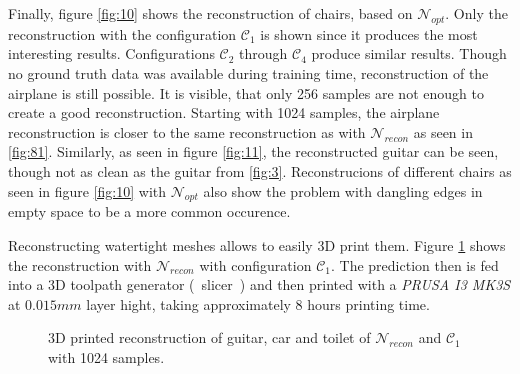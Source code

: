   Finally, figure \ref{fig:10} shows the reconstruction of chairs, based on $\mathcal{N}_{opt}$. Only the reconstruction with the configuration $\mathcal{C}_1$ is shown
  since it produces the most interesting results. Configurations $\mathcal{C}_2$ through $\mathcal{C}_4$ produce similar results. Though no ground truth data was available during training time, reconstruction
  of the airplane is still possible. It is visible, that only 256 samples are not enough to create a good reconstruction. Starting with 1024 samples, the airplane reconstruction
  is closer to the same reconstruction as with $\mathcal{N}_{recon}$ as seen in \ref{fig:81}. Similarly, as seen in figure \ref{fig:11}, the reconstructed guitar can be 
  seen, though not as clean as the guitar from \ref{fig:3}. Reconstrucions of different chairs as seen in figure \ref{fig:10} with $\mathcal{N}_{opt}$ also show the problem with dangling edges in empty space
  to be a more common occurence. 


  Reconstructing watertight meshes allows to easily 3D print them. Figure \ref{fig:13} shows the reconstruction with $\mathcal{N}_{recon}$ with configuration $\mathcal{C}_1$. 
  The prediction then is fed into a 3D toolpath generator (~slicer~)\cite{Ranellucci2011} and then printed with a \emph{PRUSA I3 MK3S} at $0.015mm$ layer hight, taking approximately 8 hours printing time.
  \begin{figure}[htbp]
    \centering
    \caption{3D printed reconstruction of guitar, car and toilet of $\mathcal{N}_{recon}$ and $\mathcal{C}_1$ with 1024 samples.} \label{fig:13}
  \end{figure}
